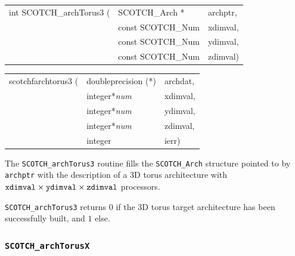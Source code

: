 \begin{itemize}
\progsyn

{\tt\begin{tabular}{l@{}ll}
int SCOTCH\_archTorus3 ( & SCOTCH\_Arch *    & archptr, \\
                         & const SCOTCH\_Num & xdimval, \\
                         & const SCOTCH\_Num & ydimval, \\
                         & const SCOTCH\_Num & zdimval) \\
\end{tabular}}

{\tt\begin{tabular}{l@{}ll}
scotchfarchtorus3 ( & doubleprecision (*) & archdat, \\
                    & integer*{\it num}   & xdimval, \\
                    & integer*{\it num}   & ydimval, \\
                    & integer*{\it num}   & zdimval, \\
                    & integer             & ierr)
\end{tabular}}

\progdes

The {\tt SCOTCH\_archTorus3} routine fills the {\tt SCOTCH\_\lbt Arch}
structure pointed to by {\tt archptr} with the description of a
3D torus architecture with $\mathtt{xdimval} \times \mbox{\tt
ydimval} \times \mathtt{zdimval}$ processors.

\progret

{\tt SCOTCH\_archTorus3} returns $0$ if the 3D torus target
architecture has been successfully built, and $1$ else.
\end{itemize}

\subsubsection{{\tt SCOTCH\_archTorusX}}

